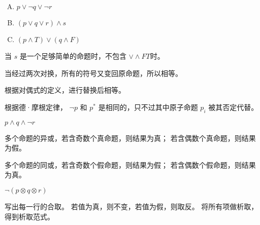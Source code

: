 {{        %
        \begin{practices}
            \begin{enumerate}[A.]
                \item $p \vee \neg q \vee \neg r$
                \item $(p \vee q \vee r) \wedge s$
                \item $(p \wedge T) \vee (q \wedge F)$
            \end{enumerate}
        \end{practices}

        \begin{practices}
            当 $s$ 是一个足够简单的命题时，不包含 $\vee \wedge F T$时。
        \end{practices}

        \begin{practices}
            当经过两次对换，所有的符号又变回原命题，所以相等。
        \end{practices}

        \begin{practices}
            根据对偶式的定义，进行替换后相等。
        \end{practices}

        \begin{practices}
            根据德·摩根定律， $\neg p$ 和 $p^{*}$ 是相同的，只不过其中原子命题 $p_i$ 被其否定代替。
        \end{practices}

        \begin{practices}
            $p \wedge q \wedge \neg r$
        \end{practices}

        \begin{practices}
            多个命题的异或，若含奇数个真命题，则结果为真；
            若含偶数个真命题，则结果为假。

            多个命题的同或，若含奇数个假命题，则结果为假；
            若含偶数个假命题，则结果为真。

            $\neg (p \otimes q \otimes r)$
        \end{practices}

        \begin{practices}
            写出每一行的合取。
            若值为真，则不变，若值为假，则取反。
            将所有项做析取，得到析取范式。
        \end{practices}

}}
